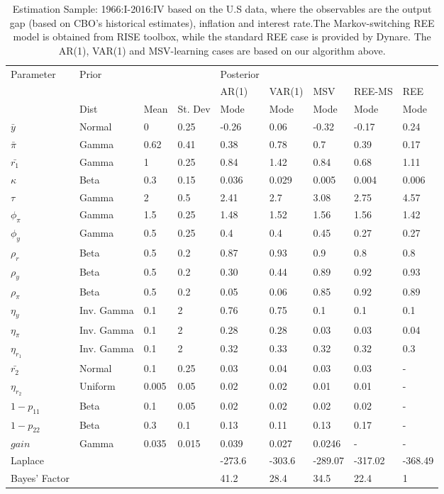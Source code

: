 \documentclass[12pt,reqno]{article}
\numberwithin{equation}{section}
\begin{document}
\begin{table}[H]

\caption{Estimation Sample: 1966:I-2016:IV based on the U.S data, where the observables are the output gap (based on CBO's historical estimates), inflation and interest rate.The Markov-switching REE model is obtained from RISE toolbox, while the standard REE case is provided by Dynare. The AR(1), VAR(1) and MSV-learning cases are based on our algorithm above. }
\label{nkpc_estimation}
\vspace{3 mm}

\begin{tabular}{l||lll||l|l|l|ll}
Parameter & Prior &  &  & Posterior &  &  &  &  \\
 &  &  &  & AR(1) & VAR(1) & MSV & REE-MS & REE \\
\hline
\hline
 & Dist & Mean & St. Dev & Mode & Mode & Mode & Mode & Mode  \\
$\bar{y}$ & Normal & 0 & 0.25 & -0.26 & 0.06 & -0.32 & -0.17 & 0.24 \\
$\bar{\pi}$ & Gamma & 0.62 & 0.41 & 0.38 & 0.78 & 0.7 & 0.39 & 0.17 \\
$\bar{r_1}$ & Gamma & 1 & 0.25 & 0.84 & 1.42 & 0.84 & 0.68 & 1.11 \\
\hline
$\kappa$ & Beta & 0.3 & 0.15 & 0.036 & 0.029 & 0.005 & 0.004 & 0.006 \\
$\tau$ & Gamma & 2 & 0.5 & 2.41 & 2.7 & 3.08 & 2.75 & 4.57 \\
\hline
$\phi_{\pi}$ & Gamma & 1.5 & 0.25 & 1.48 & 1.52 & 1.56 & 1.56 & 1.42 \\
$\phi_y$ & Gamma & 0.5 & 0.25 & 0.4 & 0.4 & 0.45 & 0.27 & 0.27 \\
$\rho_r$ & Beta & 0.5 & 0.2 & 0.87 & 0.93 & 0.9 & 0.8 & 0.8 \\
\hline
$\rho_y$ & Beta & 0.5 & 0.2 & 0.30 & 0.44 & 0.89 & 0.92 & 0.93 \\
$\rho_{\pi}$ & Beta & 0.5 & 0.2 & 0.05 & 0.06 & 0.85 & 0.92 & 0.89 \\
$\eta_y$ & Inv. Gamma & 0.1 & 2 & 0.76 & 0.75 & 0.1 & 0.1 & 0.1 \\
$\eta_{\pi}$ & Inv. Gamma & 0.1 & 2 & 0.28 & 0.28 & 0.03 & 0.03 & 0.04 \\
$\eta_{r_1}$ & Inv. Gamma & 0.1 & 2 & 0.32 & 0.33 & 0.32 & 0.32 & 0.3 \\
\hline
$\bar{r_2}$ & Normal & 0.1 & 0.25 & 0.03 & 0.04 & 0.03 & 0.03 & - \\
$\eta_{r_2}$ & Uniform & 0.005 & 0.05 & 0.02 & 0.02 & 0.01 & 0.01 & - \\
$1-p_{11}$ & Beta & 0.1 & 0.05 & 0.02 & 0.02 & 0.02 & 0.02 & - \\
$1-p_{22}$ & Beta & 0.3 & 0.1 & 0.13 & 0.11 & 0.13 & 0.17 & - \\
$gain$ & Gamma & 0.035 & 0.015 & 0.039 & 0.027 & 0.0246 & - & - \\
 \hline
\hline
Laplace &  &  &  & -273.6 & -303.6 & -289.07  & -317.02 & -368.49\\
Bayes’ Factor &  &  &  & 41.2 & 28.4 & 34.5  & 22.4 & 1
\end{tabular}
\end{table}
\end{document}
